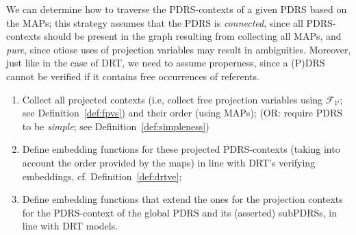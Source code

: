 
We can determine how to traverse the PDRS-contexts
of a given PDRS based on the MAPs; this strategy assumes that the PDRS is
\textit{connected}, since all PDRS-contexts should be present in the graph
resulting from collecting all MAPs, and \textit{pure}, since otiose uses of
projection variables may result in ambiguities. Moreover, just like in the
case of DRT, we need to assume properness, since a (P)DRS cannot be verified
if it contains free occurrences of referents.


\begin{enumerate}
  \item Collect all projected contexts (i.e, collect free projection
    variables using $\mathcal{F_V}$; see Definition~\ref{def:fpvs}) and
    their order (using MAPs); (OR: require PDRS to be \textit{simple}; see
    Definition~\ref{def:simpleness})
  \item Define embedding functions for these projected PDRS-contexts 
    (taking into account the order provided by the maps) in line with
    DRT's verifying embeddings, cf. Definition~\ref{def:drtve};
  \item Define embedding functions that extend the ones for the projection
    contexts for the PDRS-context of the global PDRS and its (asserted)
    subPDRSs, in line with DRT models.
\end{enumerate}





